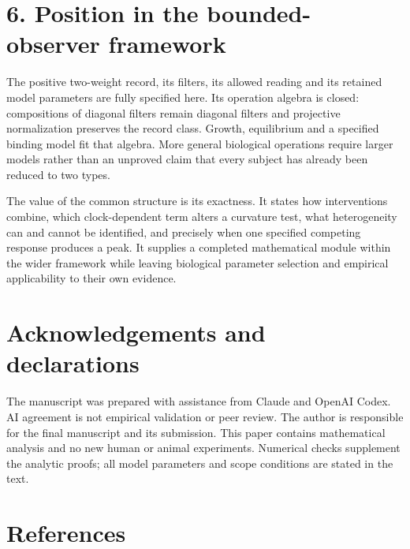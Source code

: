 \documentclass[
  11pt,
  a4paper,
]{article}
\begin{document}
\section{6. Position in the bounded-observer framework}\label{position-in-the-bounded-observer-framework}

The positive two-weight record, its filters, its allowed reading and its retained model parameters are fully specified here. Its operation algebra is closed: compositions of diagonal filters remain diagonal filters and projective normalization preserves the record class. Growth, equilibrium and a specified binding model fit that algebra. More general biological operations require larger models rather than an unproved claim that every subject has already been reduced to two types.

The value of the common structure is its exactness. It states how interventions combine, which clock-dependent term alters a curvature test, what heterogeneity can and cannot be identified, and precisely when one specified competing response produces a peak. It supplies a completed mathematical module within the wider framework while leaving biological parameter selection and empirical applicability to their own evidence.

\section{Acknowledgements and declarations}\label{acknowledgements-and-declarations}

The manuscript was prepared with assistance from Claude and OpenAI Codex. AI agreement is not empirical validation or peer review. The author is responsible for the final manuscript and its submission. This paper contains mathematical analysis and no new human or animal experiments. Numerical checks supplement the analytic proofs; all model parameters and scope conditions are stated in the text.

\section{References}\label{references}
\end{document}
